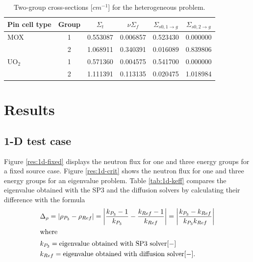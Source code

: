 \documentclass[letterpaper]{article}
\begin{document}
\begin{table}[htbp!]
\centering
\caption{Two-group cross-sections [$cm^{-1}$] for the heterogeneous problem.}
\begin{tabular}{lccccc}
\toprule
Pin cell type & Group & $\Sigma_t$ & $\nu \Sigma_f$ & $\Sigma_{s0, 1 \rightarrow g}$ & $\Sigma_{s0, 2 \rightarrow g}$ \\
\midrule
MOX       & 1     & 0.553087      & 0.006857     & 0.523430     & 0.000000                     \\
          & 2     & 1.068911      & 0.340391     & 0.016089     & 0.839806                     \\

UO$_2$    & 1     & 0.571360      & 0.004575     & 0.541700     & 0.000000                     \\
          & 2     & 1.111391      & 0.113135     & 0.020475     & 1.018984                     \\

\bottomrule
\end{tabular}
\label{tab:bench-xs-hom}
\end{table}


\section{Results}

\subsection{1-D test case}
\label{sec:results1d}

Figure \ref{res:1d-fixed} displays the neutron flux for one and three energy groups for a fixed source case.
Figure \ref{res:1d-crit} shows the neutron flux for one and three energy groups for an eigenvalue problem.
Table \ref{tab:1d-keff} compares the eigenvalue obtained with the SP3 and the diffusion solvers by calculating their difference with the formula
\begin{align}
  & \Delta_\rho = \left| \rho_{P_3} - \rho_{Ref} \right| = \left| \frac{k_{P_3}-1}{k_{P_3}} - \frac{k_{Ref}-1}{k_{Ref}} \right| = \left| \frac{k_{P_3}-k_{Ref}}{k_{P_3} k_{Ref}} \right| \label{eq:delta-rho} \\
  \intertext{where}
  & k_{P_3} = \mbox{eigenvalue obtained with SP3 solver} [-] \notag \\
  & k_{Ref} = \mbox{eigenvalue obtained with diffusion solver} [-]. \notag
\end{align}
\end{document}
